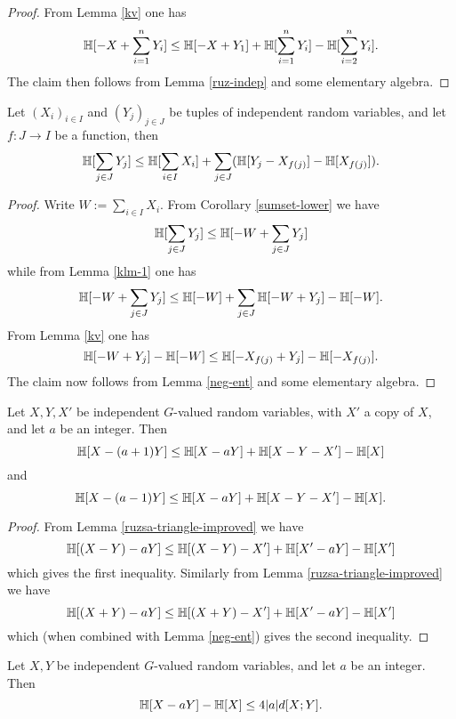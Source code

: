 \begin{proof}
  From Lemma \ref{kv} one has
  $$ \mathbb{H}[ -X + \sum_{i=1}^n Y_i ] \leq \mathbb{H}[ - X + Y_1 ] + \mathbb{H}[ \sum_{i=1}^n Y_i ] - \mathbb{H}[ \sum_{i=2}^n Y_i ].$$
  The claim then follows from Lemma \ref{ruz-indep} and some elementary algebra.
\end{proof}

\begin{lemma}\label{compare-sums}  Let $(X_i)_{i \in I}$ and $(Y_j)_{j \in J}$ be tuples of independent random variables, and let $f: J \to I$ be a function, then
  $$ \mathbb{H}[\sum_{j \in J} Y_j] \leq \mathbb{H}[ \sum_{i \in I} X_i ] + \sum_{j \in J} (\mathbb{H}[ Y_j - X_{f(j)}] - \mathbb{H}[X_{f(j)}]).$$
\end{lemma}

\begin{proof}  Write $W := \sum_{i \in I} X_i$.  From Corollary \ref{sumset-lower} we have
$$ \mathbb{H}[\sum_{j \in J} Y_j]  \leq \mathbb{H}[-W + \sum_{j \in J} Y_j]$$
while from Lemma \ref{klm-1} one has
$$ \mathbb{H}[-W + \sum_{j \in J} Y_j] \leq \mathbb{H}[-W] + \sum_{j \in J} \mathbb{H}[-W + Y_j] - \mathbb{H}[-W].$$
From Lemma \ref{kv} one has
$$ \mathbb{H}[-W + Y_j] - \mathbb{H}[-W] \leq \mathbb{H}[-X_{f(j)} + Y_j] - \mathbb{H}[-X_{f(j)}].$$
The claim now follows from Lemma \ref{neg-ent} and some elementary algebra.
\end{proof}

\begin{lemma}\label{sum-dilate-I}  Let $X,Y,X'$ be independent $G$-valued random variables, with $X'$ a copy of $X$, and let $a$ be an integer.  Then
$$\mathbb{H}[X-(a+1)Y] \leq \mathbb{H}[X-aY] + \mathbb{H}[X-Y-X'] - \mathbb{H}[X]$$
and
$$\mathbb{H}[X-(a-1)Y] \leq \mathbb{H}[X-aY] + \mathbb{H}[X-Y-X'] - \mathbb{H}[X].$$
\end{lemma}

\begin{proof}
From Lemma \ref{ruzsa-triangle-improved} we have
$$ \mathbb{H}[(X-Y)-aY] \leq \mathbb{H}[(X-Y) - X'] + \mathbb{H}[X'-aY] - \mathbb{H}[X']$$
which gives the first inequality.  Similarly from Lemma \ref{ruzsa-triangle-improved} we have
$$ \mathbb{H}[(X+Y)-aY] \leq \mathbb{H}[(X+Y) - X'] + \mathbb{H}[X'-aY] - \mathbb{H}[X']$$
which (when combined with Lemma \ref{neg-ent}) gives the second inequality.
\end{proof}

\begin{lemma}\label{sum-dilate-II}  Let $X,Y$ be independent $G$-valued random variables, and let $a$ be an integer.  Then
  $$\mathbb{H}[X-aY] - \mathbb{H}[X] \leq 4 |a| d[X;Y].$$
\end{lemma}

